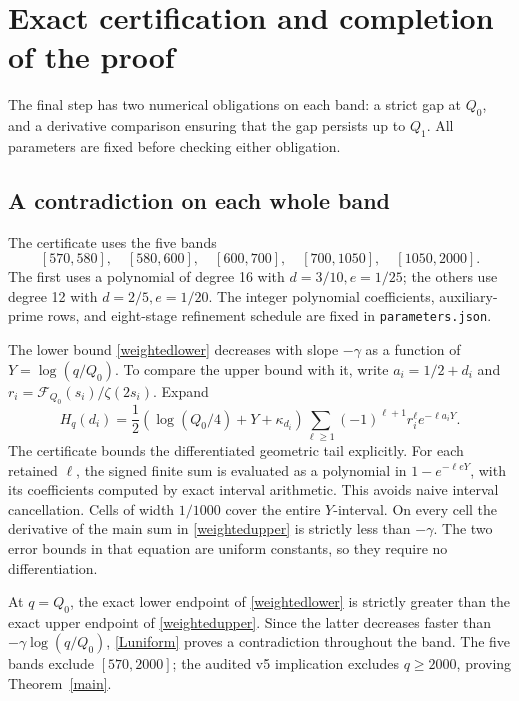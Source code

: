 \documentclass[11pt]{article}
\begin{document}
\section{Exact certification and completion of the proof}\label{certificate}
The final step has two numerical obligations on each band: a strict
gap at \(Q_0\), and a derivative comparison ensuring that the gap
persists up to \(Q_1\). All parameters are fixed before checking
either obligation.

\subsection{A contradiction on each whole band}
The certificate uses the five bands
\[
 [570,580],\quad[580,600],\quad[600,700],\quad[700,1050],\quad[1050,2000].
\]
The first uses a polynomial of degree 16 with \(d=3/10,e=1/25\);
the others use degree 12 with \(d=2/5,e=1/20\). The integer
polynomial coefficients, auxiliary-prime rows, and eight-stage
refinement schedule are fixed in \texttt{parameters.json}.

The lower bound \eqref{weightedlower} decreases with slope
\(-\gamma\) as a function of \(Y=\log(q/Q_0)\). To compare the
upper bound with it, write
\(a_i=1/2+d_i\) and
\(r_i=\mathcal F_{Q_0}(s_i)/\zeta(2s_i)\). Expand
\[
 H_q(d_i)=\frac12(\log(Q_0/4)+Y+\kappa_{d_i})
       \sum_{\ell\ge1}(-1)^{\ell+1}r_i^\ell e^{-\ell a_iY}.
\]
The certificate bounds the differentiated geometric tail explicitly.
For each retained \(\ell\), the signed finite sum is evaluated as
a polynomial in \(1-e^{-\ell eY}\), with its coefficients computed
by exact interval arithmetic. This avoids naive interval cancellation.
Cells of width \(1/1000\) cover the entire \(Y\)-interval. On every
cell the derivative of the main sum in \eqref{weightedupper} is
strictly less than \(-\gamma\). The two error bounds in that equation
are uniform constants, so they require no differentiation.


At \(q=Q_0\), the exact lower endpoint of
\eqref{weightedlower} is strictly greater than the exact upper
endpoint of \eqref{weightedupper}. Since the latter decreases faster
than \(-\gamma\log(q/Q_0)\), \eqref{Luniform} proves a contradiction
throughout the band. The five bands exclude \([570,2000]\); the
audited v5 implication excludes \(q\ge2000\), proving
Theorem~\ref{main}.
\end{document}
